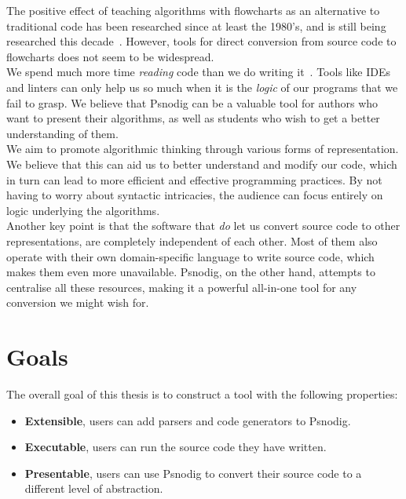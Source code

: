 The positive effect of teaching algorithms with flowcharts as an alternative to traditional code has been researched since at least the 1980's, and is still being researched this decade~\cite{flowchartsAreGood1, flowchartsAreGood2, flowchartsAreGood3}. However, tools for direct conversion from source code to flowcharts does not seem to be widespread. \\

We spend much more time \textit{reading} code than we do writing it~\cite[14]{weReadMoreThanWeCode}. Tools like IDEs and linters can only help us so much when it is the \textit{logic} of our programs that we fail to grasp. We believe that Psnodig can be a valuable tool for authors who want to present their algorithms, as well as students who wish to get a better understanding of them. \\

We aim to promote algorithmic thinking through various forms of representation. We believe that this can aid us to better understand and modify our code, which in turn can lead to more efficient and effective programming practices. By not having to worry about syntactic intricacies, the audience can focus entirely on logic underlying the algorithms. \\

Another key point is that the software that \textit{do} let us convert source code to other representations, are completely independent of each other. Most of them also operate with their own domain-specific language to write source code, which makes them even more unavailable. Psnodig, on the other hand, attempts to centralise all these resources, making it a powerful all-in-one tool for any conversion we might wish for. \\

\section{Goals}

The overall goal of this thesis is to construct a tool with the following properties:

\begin{itemize}
    \item \textbf{Extensible}, users can add parsers and code generators to Psnodig.
    \item \textbf{Executable}, users can run the source code they have written.
    \item \textbf{Presentable}, users can use Psnodig to convert their source code to a different level of abstraction.
\end{itemize}

